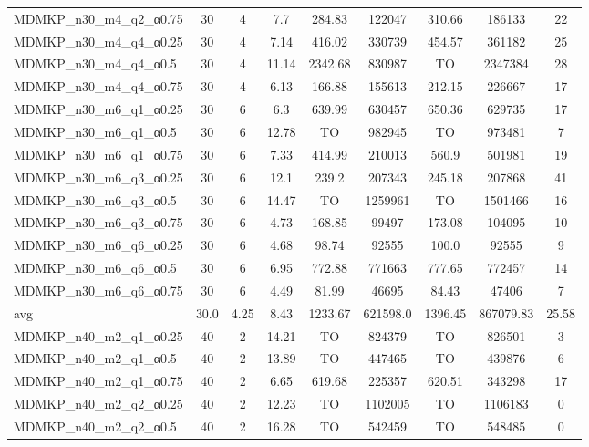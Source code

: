 \begin{table}[!ht]
{\begin{tabular}{lcccccccc}
MDMKP\_n30\_m4\_q2\_α0.75 & 30 & 4 &  \textcolor{blue2}{7.7} & 284.83 & 122047 & 310.66 & 186133 & 22 \\
MDMKP\_n30\_m4\_q4\_α0.25 & 30 & 4 &  \textcolor{blue2}{7.14} & 416.02 & 330739 & 454.57 & 361182 & 25 \\
MDMKP\_n30\_m4\_q4\_α0.5 & 30 & 4 &  \textcolor{blue2}{11.14} & 2342.68 & 830987 & TO & 2347384 & 28 \\
MDMKP\_n30\_m4\_q4\_α0.75 & 30 & 4 &  \textcolor{blue2}{6.13} & 166.88 & 155613 & 212.15 & 226667 & 17 \\
MDMKP\_n30\_m6\_q1\_α0.25 & 30 & 6 &  \textcolor{blue2}{6.3} & 639.99 & 630457 & 650.36 & 629735 & 17 \\
MDMKP\_n30\_m6\_q1\_α0.5 & 30 & 6 &  \textcolor{blue2}{12.78} & TO & 982945 & TO & 973481 & 7 \\
MDMKP\_n30\_m6\_q1\_α0.75 & 30 & 6 &  \textcolor{blue2}{7.33} & 414.99 & 210013 & 560.9 & 501981 & 19 \\
MDMKP\_n30\_m6\_q3\_α0.25 & 30 & 6 &  \textcolor{blue2}{12.1} & 239.2 & 207343 & 245.18 & 207868 & 41 \\
MDMKP\_n30\_m6\_q3\_α0.5 & 30 & 6 &  \textcolor{blue2}{14.47} & TO & 1259961 & TO & 1501466 & 16 \\
MDMKP\_n30\_m6\_q3\_α0.75 & 30 & 6 &  \textcolor{blue2}{4.73} & 168.85 & 99497 & 173.08 & 104095 & 10 \\
MDMKP\_n30\_m6\_q6\_α0.25 & 30 & 6 &  \textcolor{blue2}{4.68} & 98.74 & 92555 & 100.0 & 92555 & 9 \\
MDMKP\_n30\_m6\_q6\_α0.5 & 30 & 6 &  \textcolor{blue2}{6.95} & 772.88 & 771663 & 777.65 & 772457 & 14 \\
MDMKP\_n30\_m6\_q6\_α0.75 & 30 & 6 &  \textcolor{blue2}{4.49} & 81.99 & 46695 & 84.43 & 47406 & 7 \\
\cline{1-9} avg & 30.0 & 4.25 & 8.43 & 1233.67& 621598.0 & 1396.45& 867079.83 & 25.58\\ \cline{1-9}
MDMKP\_n40\_m2\_q1\_α0.25 & 40 & 2 &  \textcolor{blue2}{14.21} & TO & 824379 & TO & 826501 & 3 \\
MDMKP\_n40\_m2\_q1\_α0.5 & 40 & 2 &  \textcolor{blue2}{13.89} & TO & 447465 & TO & 439876 & 6 \\
MDMKP\_n40\_m2\_q1\_α0.75 & 40 & 2 &  \textcolor{blue2}{6.65} & 619.68 & 225357 & 620.51 & 343298 & 17 \\
MDMKP\_n40\_m2\_q2\_α0.25 & 40 & 2 &  \textcolor{blue2}{12.23} & TO & 1102005 & TO & 1106183 & 0 \\
MDMKP\_n40\_m2\_q2\_α0.5 & 40 & 2 &  \textcolor{blue2}{16.28} & TO & 542459 & TO & 548485 & 0 \\

\end{tabular}}
\end{table}
